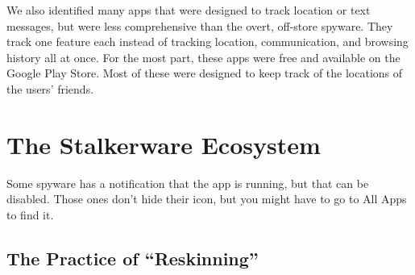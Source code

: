 \documentclass[acmtog]{acmart}
\begin{document}
We also identified many apps that were designed to track location or text 
messages, but were less comprehensive than the overt, off-store spyware. They 
track one feature each instead of tracking location, communication, and 
browsing history all at once. For the most part, these apps were free and 
available on the Google Play Store. Most of these were designed to keep track 
of the locations of the users' friends. 

\section{The Stalkerware Ecosystem}
Some spyware has a notification that the app is running, but that can be 
disabled. Those ones don't hide their icon, but you might have to go to All 
Apps to find it.
\subsection{The Practice of ``Reskinning''}
\label{reskinning}
\end{document}
